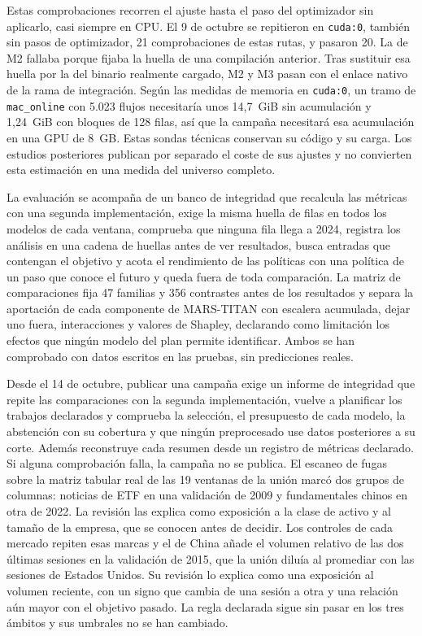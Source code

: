 \documentclass[11pt,a4paper]{report}
\begin{document}
Estas comprobaciones recorren el ajuste hasta el paso del optimizador sin
aplicarlo, casi siempre en CPU. El 9 de octubre se repitieron en
\texttt{cuda:0}, también sin pasos de optimizador, 21 comprobaciones de estas
rutas, y pasaron 20. La de M2 fallaba porque fijaba la huella de una
compilación anterior. Tras sustituir esa huella por la del binario realmente
cargado, M2 y M3 pasan con el enlace nativo de la rama de integración. Según
las medidas de memoria en \texttt{cuda:0}, un tramo de
\texttt{mac\_online} con 5.023 flujos necesitaría unos 14,7~GiB sin acumulación
y 1,24~GiB con bloques de 128 filas, así que la campaña necesitará esa
acumulación en una GPU de 8~GB. Estas sondas técnicas conservan su código y su
carga. Los estudios posteriores publican por separado el coste de sus ajustes
y no convierten esta estimación en una medida del universo completo.

La evaluación se acompaña de un banco de integridad que recalcula las métricas
con una segunda implementación, exige la misma huella de filas en todos los
modelos de cada ventana, comprueba que ninguna fila llega a 2024, registra los
análisis en una cadena de huellas antes de ver resultados, busca entradas que
contengan el objetivo y acota el rendimiento de las políticas con una política de
un paso que conoce el futuro y queda fuera de toda comparación. La matriz de comparaciones fija
47 familias y 356 contrastes antes de los resultados y separa la aportación de
cada componente de MARS-TITAN con escalera acumulada, dejar uno fuera,
interacciones y valores de Shapley, declarando como limitación los efectos que
ningún modelo del plan permite identificar. Ambos se han comprobado con datos
escritos en las pruebas, sin predicciones reales.

Desde el 14 de octubre, publicar una campaña exige un informe de integridad
que repite las comparaciones con la segunda implementación, vuelve a planificar
los trabajos declarados y comprueba la selección, el presupuesto de cada
modelo, la abstención con su cobertura y que ningún preprocesado use datos
posteriores a su corte. Además reconstruye cada resumen desde un registro de
métricas declarado. Si alguna comprobación falla, la campaña no se publica. El
escaneo de fugas sobre la matriz tabular real de las 19 ventanas de la unión
marcó dos grupos de columnas: noticias de ETF en una validación de 2009 y
fundamentales chinos en otra de 2022. La revisión las explica como exposición
a la clase de activo y al tamaño de la empresa, que se conocen antes de
decidir. Los controles de cada mercado repiten esas marcas y el de China añade
el volumen relativo de las dos últimas sesiones en la validación de 2015, que
la unión diluía al promediar con las sesiones de Estados Unidos. Su revisión
lo explica como una exposición al volumen reciente, con un signo que cambia de
una sesión a otra y una relación aún mayor con el objetivo pasado. La regla
declarada sigue sin pasar en los tres ámbitos y sus umbrales no se han
cambiado.
\end{document}
